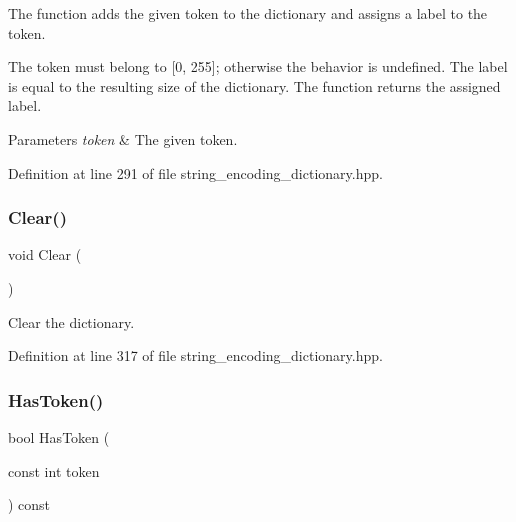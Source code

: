 The function adds the given token to the dictionary and assigns a label to the token. 

The token must belong to [0, 255]; otherwise the behavior is undefined. The label is equal to the resulting size of the dictionary. The function returns the assigned label.


\begin{DoxyParams}{Parameters}
{\em token} & The given token. \\
\hline
\end{DoxyParams}


Definition at line 291 of file string\+\_\+encoding\+\_\+dictionary.\+hpp.

\mbox{\label{classmlpack_1_1data_1_1StringEncodingDictionary_3_01int_01_4_aa71d36872f416feaa853788a7a7a7ef8}} 
\subsubsection{Clear()}
{\footnotesize\ttfamily void Clear (\begin{DoxyParamCaption}{ }\end{DoxyParamCaption})\hspace{0.3cm}{\ttfamily [inline]}}



Clear the dictionary. 



Definition at line 317 of file string\+\_\+encoding\+\_\+dictionary.\+hpp.

\mbox{\label{classmlpack_1_1data_1_1StringEncodingDictionary_3_01int_01_4_af5ed56182229283803402636c8dc2cc6}} 
\subsubsection{Has\+Token()}
{\footnotesize\ttfamily bool Has\+Token (\begin{DoxyParamCaption}\item[{const int}]{token }\end{DoxyParamCaption}) const\hspace{0.3cm}{\ttfamily [inline]}}



